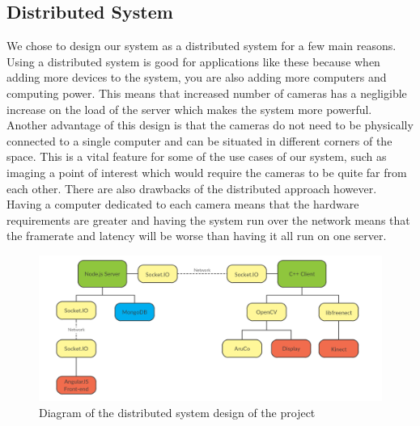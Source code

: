 \documentclass{article}
\begin{document}
\subsection{Distributed System}
We chose to design our system as a distributed system for a few main reasons. Using a distributed system is good for applications like these because when adding more devices to the system, you are also adding more computers and computing power. This means that increased number of cameras has a negligible increase on the load of the server which makes the system more powerful. Another advantage of this design is that the cameras do not need to be physically connected to a single computer and can be situated in different corners of the space. This is a vital feature for some of the use cases of our system, such as imaging a point of interest which would require the cameras to be quite far from each other. There are also drawbacks of the distributed approach however. Having a computer dedicated to each camera means that the hardware requirements are greater and having the system run over the network means that the framerate and latency will be worse than having it all run on one server.
\begin{figure}[h]
  \centering
  \includegraphics[scale=0.6]{distributed}
  \caption{Diagram of the distributed system design of the project}
\end{figure}
\newpage
\end{document}
